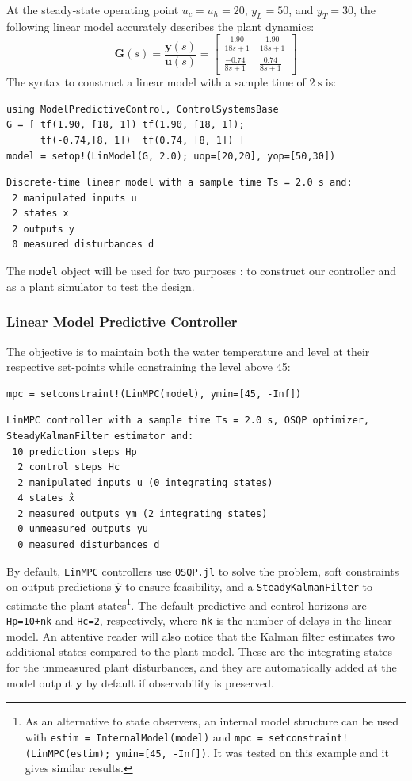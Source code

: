 At the steady-state operating point $u_c=u_h=20$, $y_L=50$, and $y_T=30$, the following linear model accurately describes the plant dynamics:
\begin{equation}
\mathbf{G}(s) = \frac{\mathbf{y}(s)}{\mathbf{u}(s)} =
\begin{bmatrix}
    \frac{1.90}{18s+1} & \frac{1.90}{18s+1} \\[3pt]
    \frac{-0.74}{8s+1} & \frac{0.74}{8s+1}
\end{bmatrix}
\end{equation}
The syntax to construct a linear model with a sample time of $\SI{2}{\second}$ is:
\begin{verbatim}
using ModelPredictiveControl, ControlSystemsBase
G = [ tf(1.90, [18, 1]) tf(1.90, [18, 1]);
      tf(-0.74,[8, 1])  tf(0.74, [8, 1]) ]
model = setop!(LinModel(G, 2.0); uop=[20,20], yop=[50,30])
\end{verbatim}
\spacerepl
\begin{verbatim}
Discrete-time linear model with a sample time Ts = 2.0 s and:
 2 manipulated inputs u
 2 states x
 2 outputs y
 0 measured disturbances d
\end{verbatim}
The \texttt{model} object will be used for two purposes : to construct our controller and as a plant simulator to test the design.

\subsubsection{Linear Model Predictive Controller}

The objective is to maintain both the water temperature and level at their respective set-points while constraining the level above 45:
\begin{verbatim}
mpc = setconstraint!(LinMPC(model), ymin=[45, -Inf])
\end{verbatim}
\spacerepl
\begin{verbatim}
LinMPC controller with a sample time Ts = 2.0 s, OSQP optimizer,
SteadyKalmanFilter estimator and:
 10 prediction steps Hp
  2 control steps Hc
  2 manipulated inputs u (0 integrating states)
  4 states x̂
  2 measured outputs ym (2 integrating states)
  0 unmeasured outputs yu
  0 measured disturbances d
\end{verbatim}
By default, \texttt{LinMPC} controllers use \texttt{OSQP.jl} \citep{osqp} to solve the problem, soft constraints on output predictions $\mathbf{\hat y}$ to ensure feasibility, and a \texttt{SteadyKalmanFilter} to estimate the plant states\footnote{As an alternative to state observers, an internal model structure can be used with \texttt{estim = InternalModel(model)} and \texttt{mpc = setconstraint!(LinMPC(estim); ymin=[45, -Inf])}. It was tested on this example and it gives similar results.}. The default predictive and control horizons are \texttt{Hp=10+nk} and \texttt{Hc=2}, respectively, where \texttt{nk} is the number of delays in the linear model. An attentive reader will also notice that the Kalman filter estimates two additional states compared to the plant model. These are the integrating states for the unmeasured plant disturbances, and they are automatically added at the model output $\mathbf{y}$ by default if observability is preserved.

